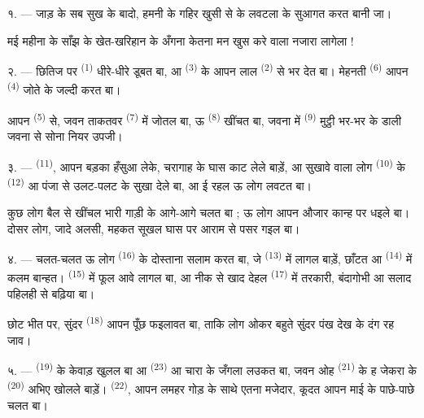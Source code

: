 \VUsaut{4.0mm}

१. --- जाड़ के सब सुख के बादो, हमनी के गहिर खुसी से  के
लवटला के सुआगत करत बानी जा।

मई महीना के साँझ के खेत-खरिहान के अँगना केतना मन खुस करे वाला नजारा
लागेला !

२. --- छितिज पर  \textsuperscript{(1)} धीरे-धीरे डूबत बा, आ
 \textsuperscript{(3)} के आपन लाल 
\textsuperscript{(2)} से भर देत बा। मेहनती 
\textsuperscript{(6)} आपन  \textsuperscript{(4)} जोते के जल्दी
करत बा।

आपन  \textsuperscript{(5)} से, जवन ताकतवर 
\textsuperscript{(7)} में जोतल बा, ऊ  \textsuperscript{(8)}
खींचत बा, जवना में  \textsuperscript{(9)} मुट्ठी भर-भर के
 डाली जवना से सोना नियर  उपजी।

३. ---  \textsuperscript{(11)}, आपन बड़का हँसुआ
लेके, चरागाह के घास काट लेले बाड़ें, आ सुखावे वाला लोग  \textsuperscript{(10)} के  \textsuperscript{(12)} आ
पंजा से उलट-पलट के सुखा देले बा, आ ई रहल ऊ लोग लवटत बा।

कुछ लोग बैल से खींचल भारी गाड़ी के आगे-आगे चलत बा ; ऊ लोग आपन औजार
कान्ह पर धइले बा। दोसर लोग, जादे अलसी, महकत सूखल घास पर आराम से पसर
गइल बा।

४. --- चलत-चलत ऊ लोग  \textsuperscript{(16)} के दोस्ताना
सलाम करत बा, जे  \textsuperscript{(13)} में लागल बाड़ें,
 छाँटत आ  \textsuperscript{(14)}
में कलम बान्हत।  \textsuperscript{(15)} में फूल
आवे लागल बा, आ नीक से खाद देहल 
\textsuperscript{(17)} में तरकारी, बंदागोभी आ सलाद पहिलही से बढ़िया बा।

छोट भीत पर, सुंदर  \textsuperscript{(18)} आपन पूँछ फइलावत बा,
ताकि लोग ओकर बहुते सुंदर पंख देख के दंग रह जाव।

\VUsaut{3.0mm}

५. ---  \textsuperscript{(19)} के केवाड़ खुलल बा आ
 \textsuperscript{(23)} आ चारा के जँगला लउकत बा, जवन ओह
 \textsuperscript{(21)} के ह जेकरा के 
\textsuperscript{(20)} अभिए खोलले बाड़ें। 
\textsuperscript{(22)}, आपन लमहर गोड़ के साथे एतना मजेदार, कूदत आपन माई
के पाछे-पाछे चलत बा।

